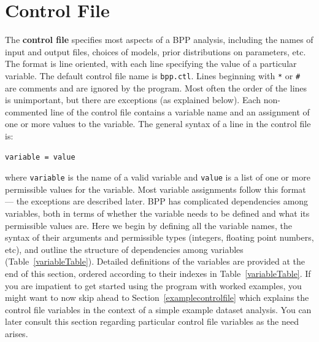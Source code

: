 \documentclass{book}
\numberwithin{equation}{section} \renewcommand{\baselinestretch}{0.55}
\begin{document}
\section{Control File} \label{ctrlfile} The \textbf{control file} specifies
most aspects of a BPP analysis, including the names of input and
output files, choices of models, prior distributions on parameters,
etc.  The format is line oriented, with each line specifying the value
of a particular variable.  The default control file name is
\texttt{bpp.ctl}.  Lines beginning with \texttt{*} or \texttt{\#} are
comments and are ignored by the program.  Most often the order of the
lines is unimportant, but there are exceptions (as explained
below). Each non-commented line of the control file contains a
variable name and an assignment of one or more values to the
variable. The general syntax of a line in the control file is:
\begin{verbatim}
variable = value
\end{verbatim}
where \texttt{variable} is the name of a valid variable and
\texttt{value} is a list of one or more permissible values for the
variable.  Most variable assignments follow this format --- the
exceptions are described later.  BPP has complicated dependencies
among variables, both in terms of whether the variable needs to be
defined and what its permissible values are. Here we begin by defining
all the variable names, the syntax of their arguments and permissible
types (integers, floating point numbers, etc), and outline the
structure of dependencies among variables
(Table~\ref{variableTable}). Detailed definitions of the variables are
provided at the end of this section, ordered according to their
indexes in Table~\ref{variableTable}. If you are impatient to get started
using the program with worked examples, you might want to now skip
ahead to Section~\ref{examplecontrolfile} which explains the control
file variables in the context of a simple example dataset analysis.
You can later consult this section regarding particular
control file variables as the need arises.
\end{document}
